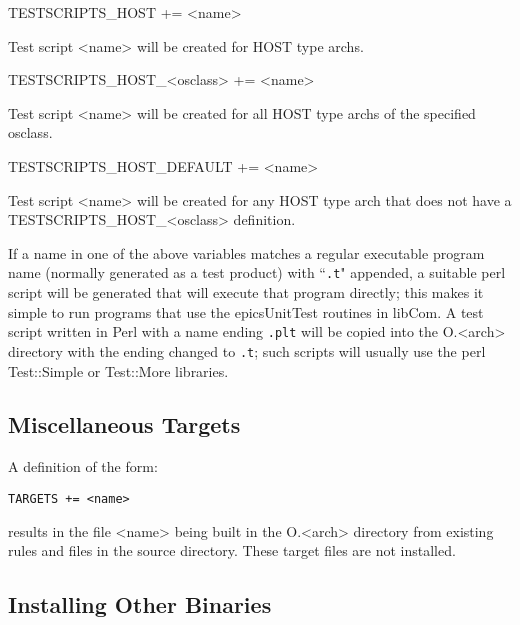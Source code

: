 \begin{description}
\item

\item {}TESTSCRIPTS\_HOST += \textless{}name\textgreater{}

Test script \textless{}name\textgreater{} will be created for HOST type archs.

\item TESTSCRIPTS\_HOST\_\textless{}osclass\textgreater{} += \textless{}name\textgreater{}

Test script \textless{}name\textgreater{} will be created for all HOST type archs of the specified osclass.

\item TESTSCRIPTS\_HOST\_DEFAULT += \textless{}name\textgreater{}

Test script \textless{}name\textgreater{} will be created for any HOST type arch that does not have a \\
TESTSCRIPTS\_HOST\_\textless{}osclass\textgreater{} definition.

\end{description}

If a name in one of the above variables matches a regular executable program name (normally generated as a test product) 
with ``\verb|.t|" appended, a suitable perl script will be generated that will execute that program directly; this makes it simple to 
run programs that use the epicsUnitTest routines in libCom.  A test script written in Perl with a name ending \verb|.plt| will be 
copied into the O.\textless{}arch\textgreater{} directory with the ending changed to \verb|.t|; such scripts will usually use the perl Test::Simple or 
Test::More libraries.

\subsection{Miscellaneous Targets}

A definition of the form:

\begin{verbatim}TARGETS += <name>
\end{verbatim}results in the file \textless{}name\textgreater{} being built in the O.\textless{}arch\textgreater{} directory from existing rules and files in the source directory. These 
target files are not installed.

\subsection{Installing Other Binaries}

